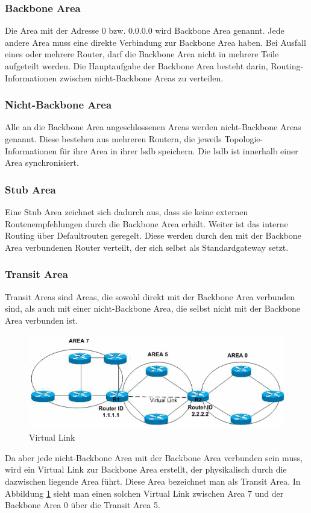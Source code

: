 \documentclass[11pt,a4paper,final]{article}
\begin{document}
\subsubsection{Backbone Area}
Die Area mit der Adresse 0 bzw. 0.0.0.0 wird Backbone Area genannt.
Jede andere Area muss eine direkte Verbindung zur Backbone Area haben.
Bei Ausfall eines oder mehrere Router, darf die Backbone Area nicht in mehrere Teile aufgeteilt werden.
Die Hauptaufgabe der Backbone Area besteht darin, Routing-Informationen zwischen nicht-Backbone Areas zu verteilen.
\subsubsection{Nicht-Backbone Area}
Alle an die Backbone Area angeschlossenen Areas werden nicht-Backbone Areas genannt.
Diese bestehen aus mehreren Routern, die jeweils Topologie-Informationen für ihre Area in ihrer \ac{lsdb} speichern.
Die \ac{lsdb} ist innerhalb einer Area synchronisiert.
\subsubsection{Stub Area}
Eine Stub Area zeichnet sich dadurch aus, dass sie keine externen Routenempfehlungen durch die Backbone Area erhält.
Weiter ist das interne Routing über Defaultrouten geregelt. Diese werden durch den mit der Backbone Area verbundenen Router verteilt, der sich selbst als Standardgateway setzt.
\subsubsection{Transit Area}
Transit Areas sind Areas, die sowohl direkt mit der Backbone Area verbunden sind, als auch mit einer nicht-Backbone Area, die selbst nicht mit der Backbone Area verbunden ist.
\begin{figure}[H]
\includegraphics[width=1.0\textwidth]{images/virtuallink.png}
\caption[OSPF Virtual Link]{Virtual Link\footnotemark}
\label{fig:virtual-link}
\end{figure}
Da aber jede nicht-Backbone Area mit der Backbone Area verbunden sein muss, wird ein Virtual Link zur Backbone Area erstellt, der physikalisch durch die dazwischen liegende Area führt.
Diese Area bezeichnet man als Transit Area.
In Abbildung \ref{fig:virtual-link} sieht man einen solchen Virtual Link zwischen Area 7 und der Backbone Area 0 über die Transit Area 5.
\end{document}
